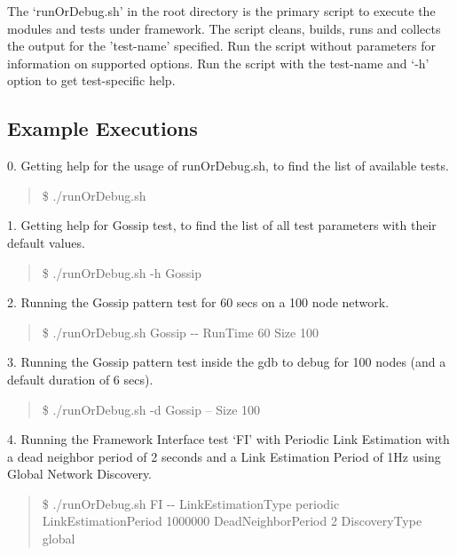 The `runOrDebug.sh' in the root directory is the primary script to execute the modules and tests under framework. The script cleans, builds, runs and collects the output for the 'test-name' specified. 
Run the script without parameters for information on supported options. Run the script with the test-name and `-h' option to get test-specific help.


\subsection{Example Executions}


0. Getting help for the usage of runOrDebug.sh, to find the list of available tests.

\begin{quote}
	\$ ./runOrDebug.sh  \\
\end{quote}

1. Getting help for Gossip test, to find the list of all test parameters with their default values.

\begin{quote}
	\$ ./runOrDebug.sh -h Gossip  \\
\end{quote}

2. Running the Gossip pattern test for 60 secs on a 100 node network.

\begin{quote}
	\$ ./runOrDebug.sh Gossip -\mbox{}- RunTime 60 Size 100\\
\end{quote}


3. Running the Gossip pattern test inside the gdb to debug for 100 nodes (and a default duration of 6 secs).

\begin{quote}
	\$ ./runOrDebug.sh -d Gossip -- Size 100\\
\end{quote}


4. Running the Framework Interface test `FI' with Periodic Link Estimation with a dead neighbor period of 2 seconds and a Link Estimation Period of 1Hz using Global Network Discovery.

\begin{quote}
\$ ./runOrDebug.sh FI -\mbox{}- LinkEstimationType periodic LinkEstimationPeriod 1000000 DeadNeighborPeriod 2 DiscoveryType global\\
\end{quote}
	
